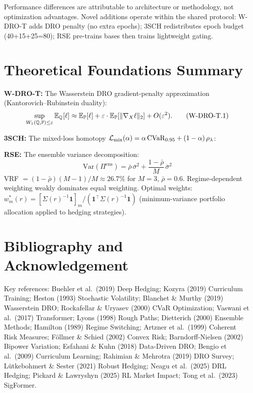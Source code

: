 Performance differences are attributable to architecture or methodology, not optimization advantages. Novel additions operate within the shared protocol: W-DRO-T adds DRO penalty (no extra epochs); 3SCH redistributes epoch budget (40+15+25=80); RSE pre-trains bases then trains lightweight gating.

\section{Theoretical Foundations Summary}
\label{app:theory}

\textbf{W-DRO-T:} The Wasserstein DRO gradient-penalty approximation (Kantorovich--Rubinstein duality):
\begin{equation}
    \sup_{W_1(\mathbb{Q},\mathbb{P})\le\varepsilon}\mathbb{E}_{\mathbb{Q}}[\ell] \approx \mathbb{E}_{\mathbb{P}}[\ell] + \varepsilon\cdot\mathbb{E}_{\mathbb{P}}[\|\nabla_X\ell\|_2] + O(\varepsilon^2).
    \tag{W-DRO-T.1}
\end{equation}

\textbf{3SCH:} The mixed-loss homotopy $\mathcal{L}_{\mathrm{mix}}(\alpha) = \alpha\,\mathrm{CVaR}_{0.95} + (1-\alpha)\,\rho_\lambda$:


\textbf{RSE:} The ensemble variance decomposition:
\begin{equation}
    \mathrm{Var}(\Pi^{\mathrm{ens}}) = \bar\rho\,\bar\sigma^2 + \frac{1-\bar\rho}{M}\,\bar\sigma^2
    \tag{RSE.1}
\end{equation}
VRF $= (1-\bar\rho)(M-1)/M \approx 26.7\%$ for $M=3$, $\bar\rho=0.6$. Regime-dependent weighting weakly dominates equal weighting. Optimal weights: $w_m^*(r) = [\Sigma(r)^{-1}\mathbf{1}]_m / (\mathbf{1}^\top\Sigma(r)^{-1}\mathbf{1})$ (minimum-variance portfolio allocation applied to hedging strategies).

\section*{Bibliography and Acknowledgement}

Key references: Buehler et al.\ (2019) Deep Hedging; Kozyra (2019) Curriculum Training; Heston (1993) Stochastic Volatility; Blanchet \& Murthy (2019) Wasserstein DRO; Rockafellar \& Uryasev (2000) CVaR Optimization; Vaswani et al.\ (2017) Transformer; Lyons (1998) Rough Paths; Dietterich (2000) Ensemble Methods; Hamilton (1989) Regime Switching; Artzner et al.\ (1999) Coherent Risk Measures; F\"ollmer \& Schied (2002) Convex Risk; Barndorff-Nielsen (2002) Bipower Variation; Esfahani \& Kuhn (2018) Data-Driven DRO; Bengio et al.\ (2009) Curriculum Learning; Rahimian \& Mehrotra (2019) DRO Survey; L\"utkebohmert \& Sester (2021) Robust Hedging; Neagu et al.\ (2025) DRL Hedging; Pickard \& Lawryshyn (2025) RL Market Impact; Tong et al.\ (2023) SigFormer.

